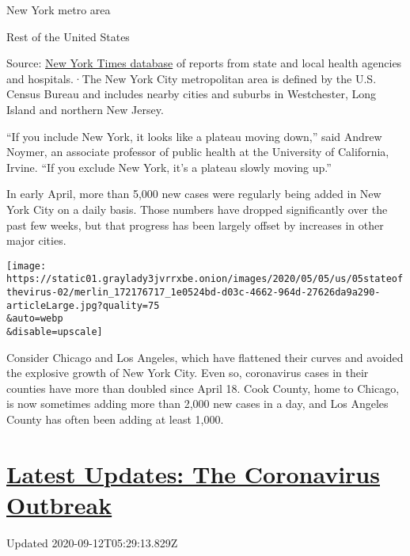 New York metro area

Rest of the United States

Source:
\href{https://www.nytimes3xbfgragh.onion/interactive/2020/us/coronavirus-us-cases.html}{New
York Times database} of reports from state and local health agencies and
hospitals.·The New York City metropolitan area is defined by the U.S.
Census Bureau and includes nearby cities and suburbs in Westchester,
Long Island and northern New Jersey.

``If you include New York, it looks like a plateau moving down,'' said
Andrew Noymer, an associate professor of public health at the University
of California, Irvine. ``If you exclude New York, it's a plateau slowly
moving up.''

In early April, more than 5,000 new cases were regularly being added in
New York City on a daily basis. Those numbers have dropped significantly
over the past few weeks, but that progress has been largely offset by
increases in other major cities.

\texttt{[image: https://static01.graylady3jvrrxbe.onion/images/2020/05/05/us/05stateofthevirus-02/merlin\_172176717\_1e0524bd-d03c-4662-964d-27626da9a290-articleLarge.jpg?quality=75\\\&auto=webp\\\&disable=upscale]}

Consider Chicago and Los Angeles, which have flattened their curves and
avoided the explosive growth of New York City. Even so, coronavirus
cases in their counties have more than doubled since April 18. Cook
County, home to Chicago, is now sometimes adding more than 2,000 new
cases in a day, and Los Angeles County has often been adding at least
1,000.

\hypertarget{latest-updates-the-coronavirus-outbreak}{%
\section{\texorpdfstring{\href{https://www.nytimes3xbfgragh.onion/2020/09/11/world/covid-19-coronavirus.html?action=click\&pgtype=Article\&state=default\&region=MAIN_CONTENT_1\&context=storylines_live_updates}{Latest
Updates: The Coronavirus
Outbreak}}{Latest Updates: The Coronavirus Outbreak}}\label{latest-updates-the-coronavirus-outbreak}}

Updated 2020-09-12T05:29:13.829Z

